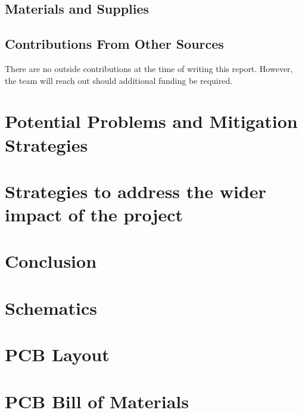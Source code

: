 \documentclass[letterpaper,12pt]{article}
\begin{document}
\subsection{Materials and Supplies}
\subsection{Contributions From Other Sources}
There are no outside contributions at the time of writing this report. However,
the team will reach out should additional funding be required.

\section{Potential Problems and Mitigation Strategies}
\section{Strategies to address the wider impact of the project}
\section{Conclusion}
\newpage


\newpage

\begin{appendices}
    \section{Schematics}
    \label{appendix:schematic}
    \section{PCB Layout}
    \label{appendix:layout}
    \section{PCB Bill of Materials}
    \label{appendix:bom}
\end{appendices}
\end{document}
